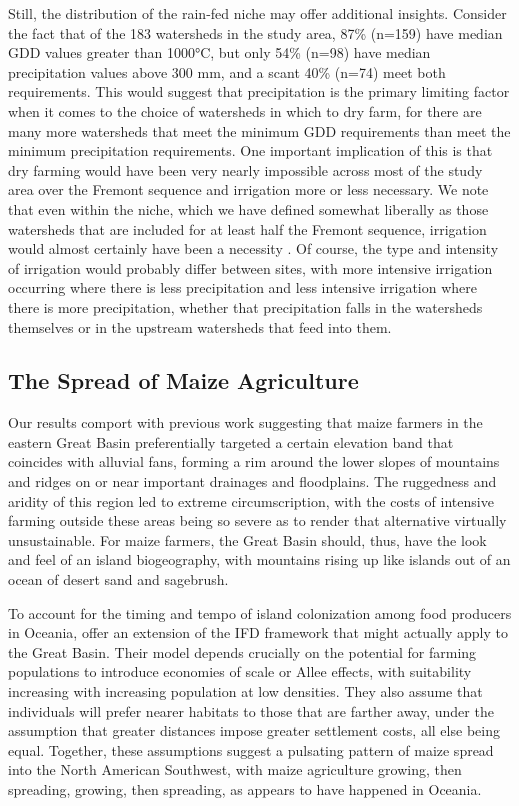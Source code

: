 \documentclass[
  number,
  preprint,
  3p]{elsarticle}
\begin{document}
Still, the distribution of the rain-fed niche may offer additional
insights. Consider the fact that of the 183 watersheds in the study
area, 87\% (n=159) have median GDD values greater than 1000°C, but only
54\% (n=98) have median precipitation values above 300 mm, and a scant
40\% (n=74) meet both requirements. This would suggest that
precipitation is the primary limiting factor when it comes to the choice
of watersheds in which to dry farm, for there are many more watersheds
that meet the minimum GDD requirements than meet the minimum
precipitation requirements. One important implication of this is that
dry farming would have been very nearly impossible across most of the
study area over the Fremont sequence and irrigation more or less
necessary. We note that even within the niche, which we have defined
somewhat liberally as those watersheds that are included for at least
half the Fremont sequence, irrigation would almost certainly have been a
necessity \citep{boomgarden2019, matson1990, spangler2010}. Of course,
the type and intensity of irrigation would probably differ between
sites, with more intensive irrigation occurring where there is less
precipitation and less intensive irrigation where there is more
precipitation, whether that precipitation falls in the watersheds
themselves or in the upstream watersheds that feed into them.

\hypertarget{the-spread-of-maize-agriculture}{%
\subsection{The Spread of Maize
Agriculture}\label{the-spread-of-maize-agriculture}}

Our results comport with previous work suggesting that maize farmers in
the eastern Great Basin preferentially targeted a certain elevation band
that coincides with alluvial fans, forming a rim around the lower slopes
of mountains and ridges on or near important drainages and floodplains.
The ruggedness and aridity of this region led to extreme
circumscription, with the costs of intensive farming outside these areas
being so severe as to render that alternative virtually unsustainable.
For maize farmers, the Great Basin should, thus, have the look and feel
of an island biogeography, with mountains rising up like islands out of
an ocean of desert sand and sagebrush.

To account for the timing and tempo of island colonization among food
producers in Oceania, \citep{kennett2006} offer an extension of the IFD
framework that might actually apply to the Great Basin. Their model
depends crucially on the potential for farming populations to introduce
economies of scale or Allee effects, with suitability increasing with
increasing population at low densities. They also assume that
individuals will prefer nearer habitats to those that are farther away,
under the assumption that greater distances impose greater settlement
costs, all else being equal. Together, these assumptions suggest a
pulsating pattern of maize spread into the North American Southwest,
with maize agriculture growing, then spreading, growing, then spreading,
as appears to have happened in Oceania.
\end{document}
